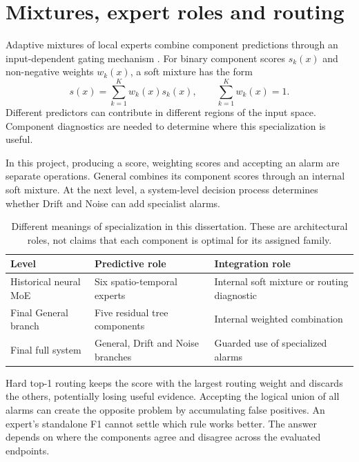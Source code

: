 \section{Mixtures, expert roles and routing}
Adaptive mixtures of local experts combine component predictions through an input-dependent gating mechanism \cite{moe}. For binary component scores $s_k(x)$ and non-negative weights $w_k(x)$, a soft mixture has the form
\begin{equation}
 s(x)=\sum_{k=1}^{K}w_k(x)s_k(x),\qquad \sum_{k=1}^{K}w_k(x)=1.
 \label{eq:softmixture}
\end{equation}
Different predictors can contribute in different regions of the input space. Component diagnostics are needed to determine where this specialization is useful.

In this project, producing a score, weighting scores and accepting an alarm are separate operations. General combines its component scores through an internal soft mixture. At the next level, a system-level decision process determines whether Drift and Noise can add specialist alarms.

\begin{table}[tbp]
\centering\small
\caption[Different meanings of specialization in this dissertation]{Different meanings of specialization in this dissertation. These are architectural roles, not claims that each component is optimal for its assigned family.}
\label{tab:roles}
\begin{tabularx}{\linewidth}{@{}lYY@{}}
\toprule
Level & Predictive role & Integration role\\
\midrule
Historical neural MoE & Six spatio-temporal experts & Internal soft mixture or routing diagnostic\\
Final General branch & Five residual tree components & Internal weighted combination\\
Final full system & General, Drift and Noise branches & Guarded use of specialized alarms\\
\bottomrule
\end{tabularx}
\end{table}

Hard top-1 routing keeps the score with the largest routing weight and discards the others, potentially losing useful evidence. Accepting the logical union of all alarms can create the opposite problem by accumulating false positives. An expert's standalone F1 cannot settle which rule works better. The answer depends on where the components agree and disagree across the evaluated endpoints.

